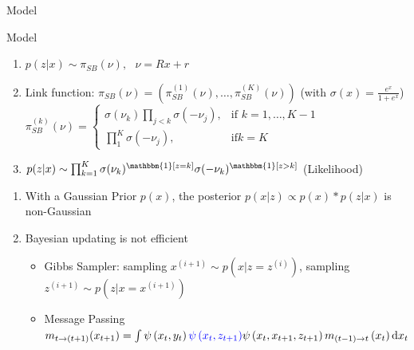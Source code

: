 \documentclass{beamer}
\begin{document}
\begin{frame}{Model}

    \end{frame}

\begin{frame}{Model}%
       \begin{tcolorbox}[colback=blue!10!white,colframe=blue!50!black,title=Stick Breaking Logitstic Regression ,boxrule=2pt, boxsep=0.1em, left=0.1em, right=0.1em,
fontupper=\fontsize{8}{10}\selectfont] %
\begin{enumerate}[\textbullet]

\item $p(z|x) \sim \pi_{SB}(\nu),\text{ } \nu=Rx+r$
\item Link function: $\pi_{SB}(\nu)=\left( \pi_{SB}^{(1)}(\nu),\dots,\pi_{SB}^{(K)}(\nu) \right)$ (with $\sigma(x)=\frac{e^x}{1+e^x}$)\\
$\pi_{SB}^{(k)}(\nu)=\begin{cases}
    \sigma(\nu_k) \prod_{j<k}\sigma(-\nu_j),& \text{if } k=1,\dots,K-1\\
    \prod_{1}^K \sigma(-\nu_j),              & \text{if} k=K
\end{cases}$\\

\item 
$p(z|x) \sim \prod _{k=1}^K \sigma(\nu_k)^{\mathbbm{1} [z=k]} \sigma(-\nu_k)^{\mathbbm{1} [z>k]}$ (Likelihood)
\end{enumerate}
\end{tcolorbox}
\begin{enumerate}[\textbullet]
\item With a Gaussian Prior $p(x)$, the posterior $p(x|z)\propto p(x)*p(z|x)$ is non-Gaussian
\item Bayesian updating is not efficient
\begin{itemize}
            \item Gibbs Sampler: sampling $x^{(i+1)} \sim p(x|z=z^{(i)})$, sampling $z^{(i+1)} \sim p(z|x=x^{(i+1)})$			
            \item Message Passing
$
m_{t \rightarrow \left(t+1\right)}(x_{t+1})=\int \psi\left(x_{t}, y_{t}\right) \textcolor{blue}{\psi\left(x_{t}, z_{t+1}\right)} \psi\left(x_{t}, x_{t+1}, z_{t+1}\right) m_{\left(t-1\right) \rightarrow t}\left(x_{t}\right) \mathrm{d} x_{t}
$
\end{itemize}
\end{enumerate}


    \end{frame}
\end{document}
